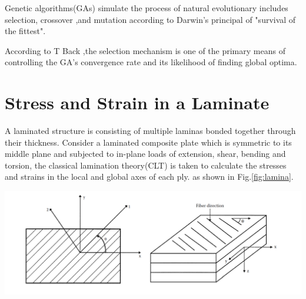 \documentclass[smallextended]{svjour3}       %
\begin{document}

Genetic algorithms(GAs) simulate the process of natural evolutionary includes selection, crossover ,and mutation  according to Darwin's principal of "survival of the fittest".

According to T Back \cite{back1994selective},the selection mechanism is one of the primary means of controlling the GA's convergence rate and its
likelihood of finding global optima.




\section{Stress and Strain in a Laminate}
A laminated structure is consisting of multiple laminas bonded together through their thickness.
Consider a laminated composite plate which is symmetric to its middle plane and subjected to in-plane
loads of extension, shear, bending and torsion,  the classical lamination theory(CLT) is taken to
calculate the stresses and strains in the local and global axes of each ply. as shown in
Fig.\ref{fig:lamina}.

\begin{center}
  \includegraphics[width=\linewidth]{A_laminate_design_images/lamina_local_global_axes.png}
  \label{fig:lamina}
\end{center}
\end{document}
